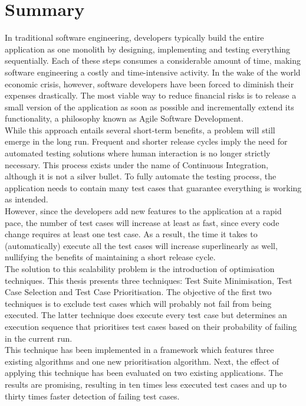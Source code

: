 
\chapter{Summary}
In traditional software engineering, developers typically build the entire application as one monolith by designing, implementing and testing everything sequentially. Each of these steps consumes a considerable amount of time, making software engineering a costly and time-intensive activity. In the wake of the world economic crisis, however, software developers have been forced to diminish their expenses drastically. The most viable way to reduce financial risks is to release a small version of the application as soon as possible and incrementally extend its functionality, a philosophy known as Agile Software Development.\\

\noindent While this approach entails several short-term benefits, a problem will still emerge in the long run. Frequent and shorter release cycles imply the need for automated testing solutions where human interaction is no longer strictly necessary. This process exists under the name of Continuous Integration, although it is not a silver bullet. To fully automate the testing process, the application needs to contain many test cases that guarantee everything is working as intended. \\

\noindent However, since the developers add new features to the application at a rapid pace, the number of test cases will increase at least as fast, since every code change requires at least one test case. As a result, the time it takes to (automatically) execute all the test cases will increase superlinearly as well, nullifying the benefits of maintaining a short release cycle.\\

\noindent The solution to this scalability problem is the introduction of optimisation techniques. This thesis presents three techniques: Test Suite Minimisation, Test Case Selection and Test Case Prioritisation. The objective of the first two techniques is to exclude test cases which will probably not fail from being executed. The latter technique does execute every test case but determines an execution sequence that prioritises test cases based on their probability of failing in the current run.\\

\noindent This technique has been implemented in a framework which features three existing algorithms and one new prioritisation algorithm. Next, the effect of applying this technique has been evaluated on two existing applications. The results are promising, resulting in ten times less executed test cases and up to thirty times faster detection of failing test cases.\\